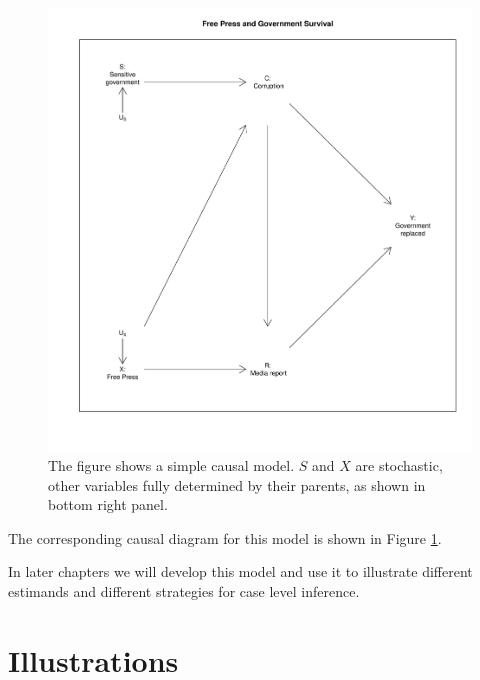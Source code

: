\documentclass[12pt,]{book}
\begin{document}
\begin{figure}

{\centering \includegraphics[width=\textwidth]{ii_files/figure-latex/running-1} 

}

\caption{The figure shows a simple causal model. $S$ and $X$ are stochastic, other variables fully determined by their parents, as shown in bottom right panel.}\label{fig:running}
\end{figure}

The corresponding causal diagram for this model is shown in Figure \ref{fig:running}.

In later chapters we will develop this model and use it to illustrate different estimands and different strategies for case level inference.

\hypertarget{illustrations}{%
\section{Illustrations}\label{illustrations}}
\end{document}
